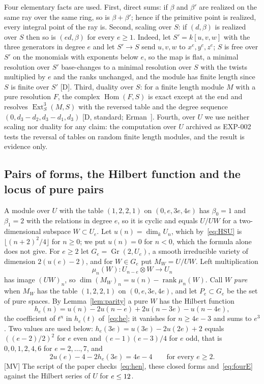 \documentclass[11pt]{article}
\theoremstyle{definition}
\theoremstyle{remark}
\newcommand{\EXP}[1]{\mbox{EXP-#1}}
\newcommand{\Ext}{\operatorname{Ext}}
\begin{document}
Four elementary facts are used. First, direct sums: if $\beta$ and $\beta'$ are realized on the same ray over the same ring, so is $\beta+\beta'$; hence if the primitive point is realized, every integral point of the ray is. Second, scaling over $S$: if $(d,\beta)$ is realized over $S$ then so is $(ed,\beta)$ for every $e\ge1$. Indeed, let $S'=k[u,v,w]$ with the three generators in degree $e$ and let $S'\to S$ send $u,v,w$ to $x^e,y^e,z^e$; $S$ is free over $S'$ on the monomials with exponents below $e$, so the map is flat, a minimal resolution over $S'$ base-changes to a minimal resolution over $S$ with the twists multiplied by $e$ and the ranks unchanged, and the module has finite length since $S$ is finite over $S'$ [D]. Third, duality over $S$: for a finite length module $M$ with a pure resolution $F$, the complex $\operatorname{Hom}(F,S)$ is exact except at the end and resolves $\Ext^3_S(M,S)$ with the reversed table and the degree sequence $(0,d_3-d_2,d_3-d_1,d_3)$ [D, standard; Erman~\cite[Remark~3.2]{Erman09}]. Fourth, over $U$ we use neither scaling nor duality for any claim: the computation over $U$ archived as \EXP{002} tests the reversal of tables on \ndualCases{} random finite length modules, and the result is evidence only.

\subsection{Pairs of forms, the Hilbert function and the locus of pure pairs}
\label{sec:pairsetting}

A module over $U$ with the table $(1,2,2,1)$ on $(0,e,3e,4e)$ has $\beta_0=1$ and $\beta_1=2$ with the relations in degree $e$, so it is cyclic and equals $U/UW$ for a two-dimensional subspace $W\subset U_e$. Let $u(n)=\dim_kU_n$, which by~\eqref{eq:HSU} is $\lfloor(n+2)^2/4\rfloor$ for $n\ge0$; we put $u(n)=0$ for $n<0$, which the formula alone does not give. For $e\ge2$ let $G_e=\operatorname{Gr}(2,U_e)$, a smooth irreducible variety of dimension $2(u(e)-2)$, and for $W\in G_e$ put $M_W=U/UW$. Left multiplication
\begin{equation}\label{eq:mu}
\mu_n(W):U_{n-e}\otimes W\longrightarrow U_n
\end{equation}
has image $(UW)_n$, so $\dim(M_W)_n=u(n)-\operatorname{rank}\mu_n(W)$. Call $W$ \emph{pure} when $M_W$ has the table $(1,2,2,1)$ on $(0,e,3e,4e)$, and let $P_e\subset G_e$ be the set of pure spaces. By Lemma~\ref{lem:parity} a pure $W$ has the Hilbert function
\begin{equation}\label{eq:hen}
h_e(n)=u(n)-2u(n-e)+2u(n-3e)-u(n-4e),
\end{equation}
the coefficient of $t^n$ in $h_e(t)$ of~\eqref{eq:he}; it vanishes for $n\ge4e-3$ and sums to $e^3$. Two values are used below: $h_e(3e)=u(3e)-2u(2e)+2$ equals $((e-2)/2)^2$ for $e$ even and $(e-1)(e-3)/4$ for $e$ odd, that is $0,0,1,2,4,6$ for $e=2,\dots,7$, and
\begin{equation}\label{eq:fourE}
2u(e)-4-2h_e(3e)=4e-4\qquad\text{for every }e\ge2.
\end{equation}
[MV] The script of the paper checks~\eqref{eq:hen}, these closed forms and~\eqref{eq:fourE} against the Hilbert series of $U$ for $e\le12$.
\end{document}
